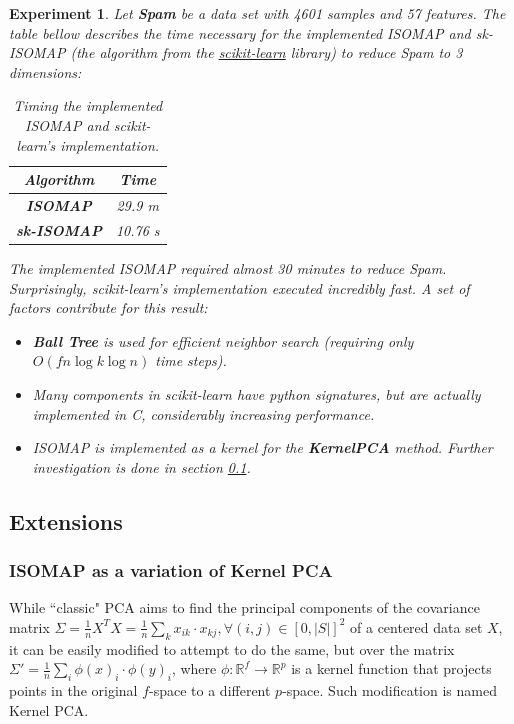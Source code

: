 \documentclass[12pt]{report}
\newtheorem{experiment}{Experiment}[section]
\begin{document}
\begin{experiment}
	Let \textbf{Spam} be a data set with 4601 samples and 57 features. The table bellow describes the time necessary for the implemented ISOMAP and sk-ISOMAP (the algorithm from the \href{http://scikit-learn.org}{scikit-learn} library) to reduce Spam to 3 dimensions:

	\begin{table}[H]
		\centering
		\begin{tabular}{|c|c|}
			\hline
			\textbf{Algorithm} & Time \\\hline
			\textbf{ISOMAP} & 29.9 m \\\hline
			\textbf{sk-ISOMAP} & 10.76 s \\\hline
		\end{tabular}

		\caption{Timing the implemented ISOMAP and scikit-learn's implementation.}
	\end{table}

	The implemented ISOMAP required almost 30 minutes to reduce Spam.
	Surprisingly, scikit-learn's implementation executed incredibly fast. A set of factors contribute for this result:

	\begin{itemize}
		\item \textbf{Ball Tree} is used for efficient neighbor search (requiring only $O(f n \log k \log n)$ time steps).
		\item Many components in scikit-learn have python signatures, but are actually implemented in C, considerably increasing performance.
		\item ISOMAP is implemented as a kernel for the \textbf{KernelPCA} method. Further investigation is done in section \ref{sec:ISOMAP_extensions}.
	\end{itemize}

\end{experiment}

\subsection{Extensions}
\label{sec:ISOMAP_extensions}

\subsubsection{ISOMAP as a variation of Kernel PCA}

While ``classic" PCA aims to find the principal components of the covariance matrix $\Sigma = \frac{1}{n} X^T X = \frac{1}{n} \sum_k x_{ik} \cdot x_{kj}, \forall (i, j) \in [0, |S|]^2$ of a centered data set $X$, it can be easily modified to attempt to do the same, but over the matrix $\Sigma' = \frac{1}{n} \sum_i \phi(x)_i \cdot \phi(y)_i$, where $\phi \colon \mathbb{R}^f \to \mathbb{R}^p$ is a kernel function that projects points in the original $f$-space to a different $p$-space. Such modification is named Kernel PCA.
\end{document}
